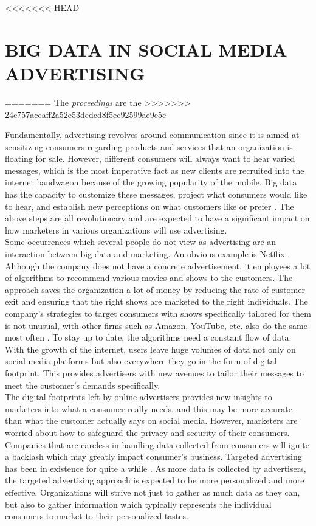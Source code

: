 \documentclass[sigconf]{acmart}
\begin{document}
<<<<<<< HEAD
\section{BIG DATA IN SOCIAL MEDIA ADVERTISING}
=======
The \textit{proceedings} are the \cite{VanGundy09}
>>>>>>> 24c757aceaff2a52e53dedcd8f5ec92599ae9e5c

Fundamentally, advertising revolves around communication since it is aimed at sensitizing consumers regarding products and services that an organization is floating for sale. However, different consumers will always want to hear varied messages, which is the most imperative fact as new clients are recruited into the internet bandwagon because of the growing popularity of the mobile. Big data has the capacity to customize these messages, project what consumers would like to hear, and establish new perceptions on what customers like or prefer \cite{Hensel&Deis2010}. The above steps are all revolutionary and are expected to have a significant impact on how marketers in various organizations will use advertising.  \\
Some occurrences which several people do not view as advertising are an interaction between big data and marketing. An obvious example is Netflix \cite{Eastwood2017}. Although the company does not have a concrete advertisement, it employees a lot of algorithms to recommend various movies and shows to the customers. The approach saves the organization a lot of money by reducing the rate of customer exit and ensuring that the right shows are marketed to the right individuals. The company’s strategies to target consumers with shows specifically tailored for them is not unusual, with other firms such as Amazon, YouTube, etc. also do the same most often \cite{Eastwood2017}. To stay up to date, the algorithms need a constant flow of data. With the growth of the internet, users leave huge volumes of data not only on social media platforms but also everywhere they go in the form of digital footprint.  This provides advertisers with new avenues to tailor their messages to meet the customer's demands specifically. \\
The digital footprints left by online advertisers provides new insights to marketers into what a consumer really needs, and this may be more accurate than what the customer actually says on social media. However, marketers are worried about how to safeguard the privacy and security of their consumers. Companies that are careless in handling data collected from consumers will ignite a backlash which may greatly impact consumer’s business. Targeted advertising has been in existence for quite a while \cite{Eastwood2017}. As more data is collected by advertisers, the targeted advertising approach is expected to be more personalized and more effective. Organizations will strive not just to gather as much data as they can, but also to gather information which typically represents the individual consumers to market to their personalized tastes. 
\end{document}
